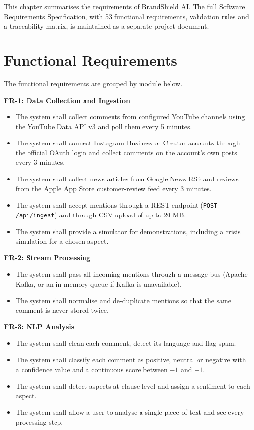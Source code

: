 \documentclass[12pt,a4paper]{report}
\begin{document}
This chapter summarises the requirements of BrandShield AI. The full Software Requirements Specification, with 53 functional requirements, validation rules and a traceability matrix, is maintained as a separate project document.

\section{Functional Requirements}

The functional requirements are grouped by module below.

\textbf{FR-1: Data Collection and Ingestion}
\begin{itemize}
    \item The system shall collect comments from configured YouTube channels using the YouTube Data API v3 and poll them every 5 minutes.
    \item The system shall connect Instagram Business or Creator accounts through the official OAuth login and collect comments on the account's own posts every 3 minutes.
    \item The system shall collect news articles from Google News RSS and reviews from the Apple App Store customer-review feed every 3 minutes.
    \item The system shall accept mentions through a REST endpoint (\texttt{POST /api/ingest}) and through CSV upload of up to 20 MB.
    \item The system shall provide a simulator for demonstrations, including a crisis simulation for a chosen aspect.
\end{itemize}

\textbf{FR-2: Stream Processing}
\begin{itemize}
    \item The system shall pass all incoming mentions through a message bus (Apache Kafka, or an in-memory queue if Kafka is unavailable).
    \item The system shall normalise and de-duplicate mentions so that the same comment is never stored twice.
\end{itemize}

\textbf{FR-3: NLP Analysis}
\begin{itemize}
    \item The system shall clean each comment, detect its language and flag spam.
    \item The system shall classify each comment as positive, neutral or negative with a confidence value and a continuous score between $-1$ and $+1$.
    \item The system shall detect aspects at clause level and assign a sentiment to each aspect.
    \item The system shall allow a user to analyse a single piece of text and see every processing step.
\end{itemize}
\end{document}
